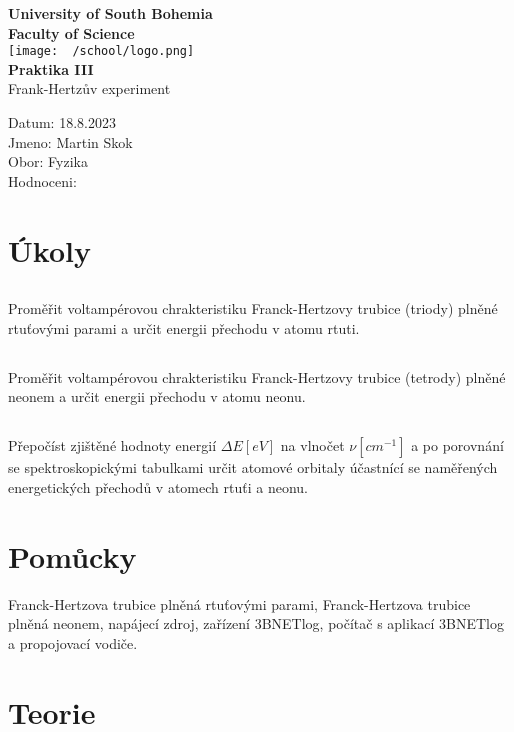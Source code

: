 \documentclass{article}
\begin{document}
\begin{center}
\textbf{\Huge{University of South Bohemia}}\\
\vspace{50px}
\textbf{\Large{Faculty of Science}} \\
\vspace{30px}
\texttt{[image: ~/school/logo.png]} \\
\vspace{30px}
\textbf{\large{Praktika III}}
\vspace{20px}
\\
\vspace{20px}
\large{Frank-Hertzův experiment} \\
\vspace{60px}
\end{center}
\begin{flushleft}
Datum: 18.8.2023 \\
Jmeno: Martin Skok \\
Obor: Fyzika \\
Hodnoceni:
\end{flushleft}
\newpage
\section{Úkoly}
\subsection{}
Proměřit voltampérovou chrakteristiku Franck-Hertzovy trubice (triody) plněné
rtuťovými parami a určit energii přechodu v atomu rtuti.
\subsection{}
Proměřit voltampérovou chrakteristiku Franck-Hertzovy trubice (tetrody) plněné
neonem a určit energii přechodu v atomu neonu.
\subsection{}
Přepočíst zjištěné hodnoty energií $\Delta E [eV]$ na vlnočet $\nu [cm^{-1}]$ a po porovnání
se spektroskopickými tabulkami určit atomové orbitaly účastnící se naměřených energetických
přechodů v atomech rtuťi a neonu.
\section{Pomůcky}
Franck-Hertzova trubice plněná rtuťovými parami, Franck-Hertzova trubice plněná neonem,
napájecí zdroj, zařízení 3BNETlog, počítač s aplikací 3BNETlog a propojovací vodiče.
\section{Teorie}
\end{document}
